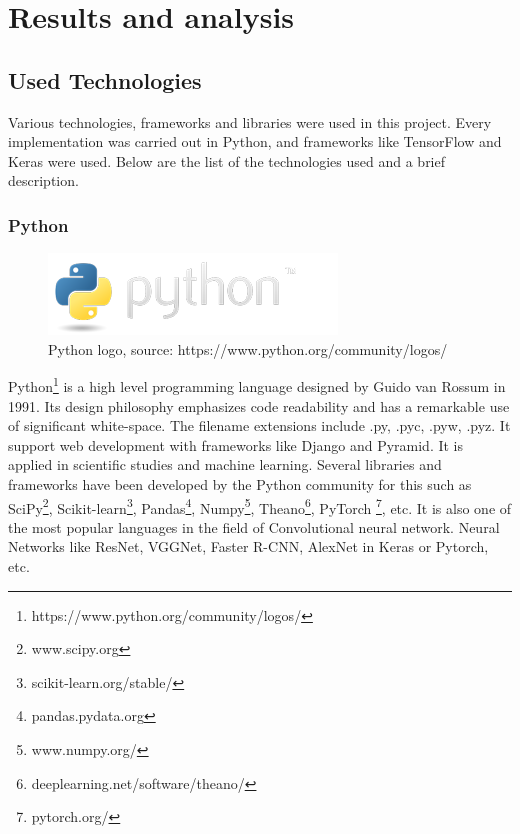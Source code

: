 \chapter{Results and analysis}\label{ch:Results}


\section{Used Technologies}
Various technologies, frameworks and libraries were used in this project. Every implementation was carried out in Python, and frameworks like TensorFlow and Keras were used. Below are the list of the technologies used and a brief description.

\subsection{Python}

\begin{figure}[H]
    \centering
    \includegraphics[width=0.8\linewidth]{images/python-logo.png}
     \caption{Python logo, source: https://www.python.org/community/logos/}
  \end{figure}

Python\footnote{https://www.python.org/community/logos/} is a high level programming language designed by Guido van Rossum in 1991. Its design philosophy emphasizes code readability and has a remarkable use of significant white-space. The filename extensions include .py, .pyc, .pyw, .pyz. It support web development with frameworks like Django and Pyramid. It is applied in scientific studies and machine learning. Several libraries and frameworks have been developed by the Python community for this such as 
SciPy\footnote{www.scipy.org}, Scikit-learn\footnote{scikit-learn.org/stable/}, Pandas\footnote{pandas.pydata.org}, Numpy\footnote{www.numpy.org/}, Theano\footnote{deeplearning.net/software/theano/}, PyTorch \footnote{pytorch.org/}, etc. It is also one of the most popular languages in the field of Convolutional neural network. Neural Networks like ResNet, VGGNet, Faster R-CNN, AlexNet in Keras or Pytorch, etc. 

